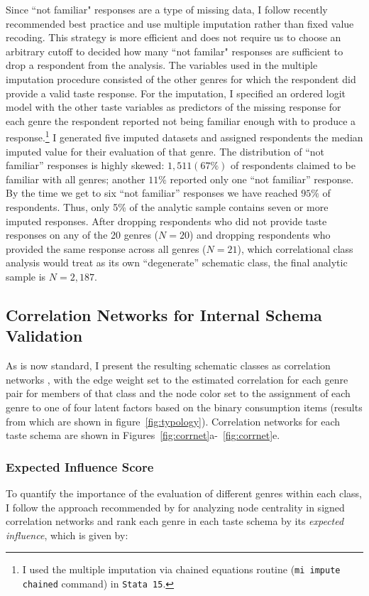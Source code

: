 \documentclass[preprint, authoryear,11pt, 3p]{elsarticle}
\begin{document}
Since ``not familiar" responses are a type of missing data, I follow recently recommended best practice and use multiple imputation rather than fixed value recoding. This strategy is more efficient and does not require us to choose an arbitrary cutoff to decided how many ``not familar" responses are sufficient to drop a respondent from the analysis. The variables used in the multiple imputation procedure consisted of the other genres for which the respondent did provide a valid taste response. For the imputation, I specified an ordered logit model with the other taste variables as predictors of the missing response for each genre the respondent reported not being familiar enough with to produce a response.\footnote{I used the multiple imputation via chained equations routine (\texttt{mi impute chained} command) in \texttt{Stata 15}.} I generated five imputed datasets and assigned respondents the median imputed value for their evaluation of that genre. The distribution of ``not familiar'' responses is highly skewed: $1,511 (67\%)$ of respondents claimed to be familiar with all genres; another $11\%$ reported only one ``not familiar'' response. By the time we get to six ``not familiar'' responses we have reached $95\%$ of respondents. Thus, only 5\% of the analytic sample contains seven or more imputed responses. After dropping respondents who did not provide taste responses on any of the 20 genres ($N = 20$) and dropping respondents who provided the same response across all genres ($N = 21$), which correlational class analysis would treat as its own ``degenerate'' schematic class, the final analytic sample is $N= 2,187$.

\subsection{Correlation Networks for Internal Schema Validation} 
As is now standard, I present the resulting schematic classes as correlation networks \citep{ boutyline2017improving, goldberg2011mapping, epskamp2012qgraph}, with the edge weight set to the estimated correlation for each genre pair for members of that class and the node color set to the assignment of each genre to one of four latent factors based on the binary consumption items (results from which are shown in figure~\ref{fig:typology}). Correlation networks for each taste schema are shown in Figures~\ref{fig:corrnet}a-~\ref{fig:corrnet}e. 

\subsubsection{Expected Influence Score}
To quantify the importance of the evaluation of different genres within each class, I follow the approach recommended by \citet{robinaugh2016identifying} for analyzing node centrality in signed correlation networks and rank each genre in each taste schema by its \emph{expected influence}, which is given by:
\end{document}
